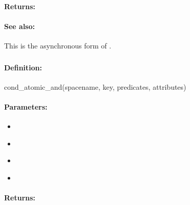 \paragraph{Returns:}


\paragraph{See also:}  This is the asynchronous form of .

\pagebreak
\subsubsection{}
\label{api:ruby:cond_atomic_and}


\paragraph{Definition:}
\begin{rubycode}
cond_atomic_and(spacename, key, predicates, attributes)
\end{rubycode}

\paragraph{Parameters:}
\begin{itemize}[noitemsep]
\item {}\\

\item {}\\

\item {}\\

\item {}\\

\end{itemize}

\paragraph{Returns:}


